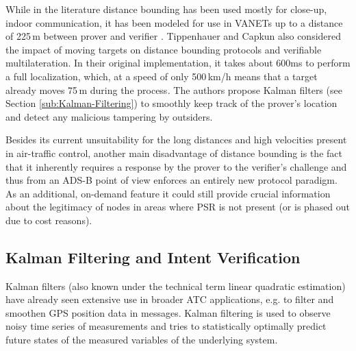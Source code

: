 \documentclass[english]{IEEEtran}
\begin{document}
While in the literature distance bounding has been used mostly for
close-up, indoor communication, it has been modeled for use in VANETs
up to a distance of 225\,m between prover and verifier \cite{Song2008,Ranganathan}.
Tippenhauer and Capkun \cite{Tippenhauer2009} also considered the
impact of moving targets on distance bounding protocols and verifiable
multilateration. In their original implementation, it takes about
600ms to perform a full localization, which, at a speed of only 500\,km/h
means that a target already moves 75\,m during the process\emph{.
}The authors propose Kalman filters (see Section \ref{sub:Kalman-Filtering})
to smoothly keep track of the prover's location and detect any malicious
tampering by outsiders.

Besides its current unsuitability for the long distances and high
velocities present in air-traffic control, another main disadvantage
of distance bounding is the fact that it inherently requires a response
by the prover to the verifier's challenge and thus from an ADS-B point
of view enforces an entirely new protocol paradigm. As an additional,
on-demand feature it could still provide crucial information about
the legitimacy of nodes in areas where PSR is not present (or is phased
out due to cost reasons).\\



\subsection{Kalman Filtering and Intent Verification\label{sub:Kalman-Filtering}}

Kalman filters (also known under the technical term linear quadratic
estimation) \cite{Kalman1960a} have already seen extensive use in
broader ATC applications, e.g. to filter and smoothen GPS position
data in messages. Kalman filtering is used to observe noisy time series
of measurements and tries to statistically optimally predict future
states of the measured variables of the underlying system.\emph{ }
\end{document}
